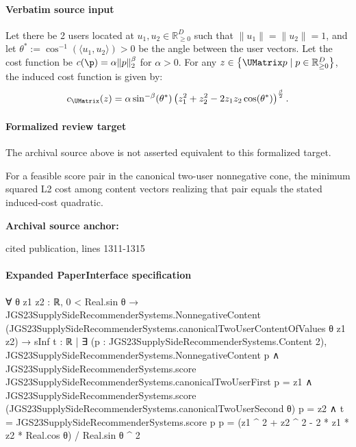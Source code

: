 \documentclass[10pt]{article}
\begin{document}
\paragraph{Verbatim source input}
\begin{ReviewVerbatim}
\begin{lemma}
\label{lemma:inducedcost}
Let there be 2 users located at $u_1, u_2 \in \mathbb{R}_{\ge 0}^D$ such that  $\|u_1\| = \|u_2\| = 1$, and let $\theta^* := \cos^{-1}\left( \langle u_1, u_2\rangle \right) > 0$ be the angle between the user vectors. Let the cost function be $c(\p) = \alpha \|p\|_2^{\beta}$ for $\alpha > 0$. For any $z \in \left\{\UMatrix p \mid p \in \mathbb{R}_{\ge 0}^D \right\}$, the induced cost function is given by:
\[c_{\UMatrix}(z) = \alpha \sin^{-\beta}(\theta^*) \left(z_1^2 + z_2^2 - 2 z_1 z_2 \cos(\theta^*) \right)^{\frac{\beta}{2}}.\]
\end{lemma}
\end{ReviewVerbatim}


\paragraph{Formalized review target}
The archival source above is not asserted equivalent to this formalized target.
\begin{ReviewVerbatim}
For a feasible score pair in the canonical two-user nonnegative cone, the minimum squared L2 cost among content vectors realizing that pair equals the stated induced-cost quadratic.
\end{ReviewVerbatim}

\textbf{Archival source anchor:} {\footnotesize\raggedright cited publication, lines 1311-\allowbreak{}1315\par}
\paragraph{Expanded PaperInterface specification}
\begin{ReviewVerbatim}
∀ {θ z1 z2 : ℝ},
  0 < Real.sin θ →
    JGS23SupplySideRecommenderSystems.NonnegativeContent
        (JGS23SupplySideRecommenderSystems.canonicalTwoUserContentOfValues θ z1 z2) →
      sInf
          {t : ℝ |
            ∃ (p : JGS23SupplySideRecommenderSystems.Content 2),
              JGS23SupplySideRecommenderSystems.NonnegativeContent p ∧
                JGS23SupplySideRecommenderSystems.score JGS23SupplySideRecommenderSystems.canonicalTwoUserFirst p = z1 ∧
                  JGS23SupplySideRecommenderSystems.score (JGS23SupplySideRecommenderSystems.canonicalTwoUserSecond θ)
                        p =
                      z2 ∧
                    t = JGS23SupplySideRecommenderSystems.score p p} =
        (z1 ^ 2 + z2 ^ 2 - 2 * z1 * z2 * Real.cos θ) / Real.sin θ ^ 2
\end{ReviewVerbatim}
\end{document}
